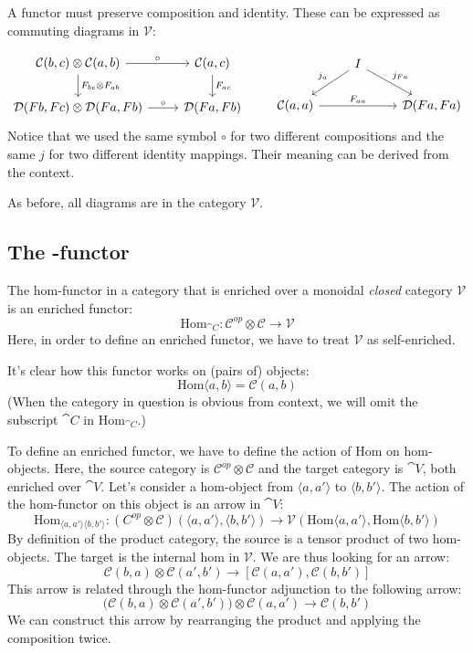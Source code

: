 \documentclass[DaoFP]{subfiles}
\begin{document}
A functor must preserve composition and identity. These can be expressed as commuting diagrams in $\mathcal V$:

\[
 \begin{tikzcd}
 \mathcal C(b, c) \otimes \mathcal C(a, b) 
 \arrow[r, "\circ"]
 \arrow[d, "F_{b c} \otimes F_{a b}"]
 & \mathcal C(a, c)
 \arrow[d, "F_{a c}"]
 \\
 \mathcal D(F b, F c) \otimes \mathcal D (F a, F b)
 \arrow[r, "\circ"]
 & \mathcal D(F a, F b)
 \end{tikzcd}
 \qquad
 \begin{tikzcd}
 & I
 \arrow[dl, "j_a"']
 \arrow[dr, "j_{F a}"]
 \\
 \mathcal C(a, a)
 \arrow[rr, "F_{a a}"]
 && \mathcal D( F a, F a)
  \end{tikzcd}
\]
Notice that we used the same symbol $\circ$ for two different compositions and the same $j$ for two different identity mappings. Their meaning can be derived from the context.

As before, all diagrams are in the category $\mathcal V$.

\subsection{The -functor}

The hom-functor in a category that is enriched over a monoidal \emph{closed} category $\mathcal V$ is an enriched functor:
\[ \text{Hom}_{\cat C} \colon \mathcal C^{op} \otimes \mathcal C \to \mathcal V \]
Here, in order to define an enriched functor, we have to treat $\mathcal V$ as self-enriched. 

It's clear how this functor works on (pairs of) objects:
\[ \text{Hom} \langle a, b \rangle = \mathcal C (a, b) \]
(When the category in question is obvious from context, we will omit the subscript $\cat C$ in $ \text{Hom}_{\cat C}$.)

To define an enriched functor, we have to define the action of $\text{Hom}$ on hom-objects. Here, the source category is $\mathcal C^{op} \otimes \mathcal C$ and the target category is $\cat V$, both enriched over $\cat V$. Let's consider a hom-object from $\langle a, a' \rangle$ to $\langle b, b' \rangle$. The action of the hom-functor on this object is an arrow in $\cat V$:
\[ \text{Hom}_{\langle a, a' \rangle \langle b, b' \rangle} \colon (C^{op} \otimes \mathcal C)(\langle a, a' \rangle, \langle b, b' \rangle) \to \mathcal V (\text{Hom}\langle a, a' \rangle, \text{Hom}\langle b, b' \rangle)\]
By definition of the product category, the source is a tensor product of two hom-objects. The target is the internal hom in $\mathcal V$. We are thus looking for an arrow:
\[ \mathcal C(b, a) \otimes \mathcal C(a', b') \to [\mathcal C(a, a'), \mathcal C(b, b')] \]
This arrow is related through the hom-functor adjunction to the following arrow:
\[ \Big( \mathcal C(b, a) \otimes \mathcal C(a', b') \Big) \otimes \mathcal C(a, a') \to \mathcal C(b, b') \]
We can construct this arrow by rearranging the product and applying the composition twice.
\end{document}
